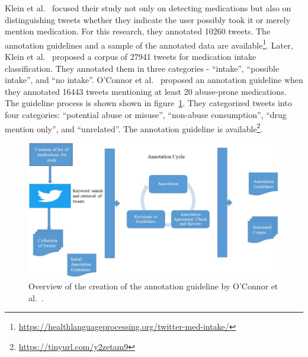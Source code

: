 Klein et al.~\cite{klein2017detecting} focused their study not only on detecting medications but also on distinguishing tweets whether they indicate the user possibly took it or merely mention medication. For this research, they annotated 10260 tweets. The annotation guidelines and a sample of the annotated data are available\footnote{\url{https://healthlanguageprocessing.org/twitter-med-intake/}}. Later, Klein et al.~\cite{klein2019analysis} proposed a corpus of 27941 tweets for medication intake classification. They annotated them in three categories - “intake”, “possible intake”, and “no intake”. O’Connor et al.~\cite{o2020promoting} proposed an annotation guideline when they annotated 16443 tweets mentioning at least 20 abuse-prone medications. The guideline process is shown shown in figure~\ref{fig:annotation-oconnor}. They categorized tweets into four categories: “potential abuse or misuse”, “non-abuse consumption”, “drug mention only”, and “unrelated”. The annotation guideline is available\footnote{\url{https://tinyurl.com/y2zetam9}}.

\begin{figure}[h]
	\centering
	\includegraphics[width=0.99\linewidth]{Figures/d.png}
	\caption{Overview of the creation of the annotation guideline by O’Connor et al.~\cite{o2020promoting}.}
	\label{fig:annotation-oconnor}
\end{figure}